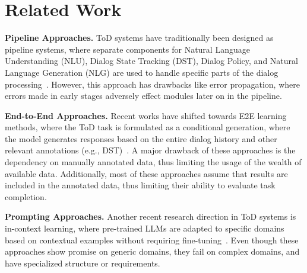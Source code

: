 \vspace{-8pt}
\section{Related Work}
\vspace{-7pt}

\textbf{Pipeline Approaches.}
ToD systems have traditionally been designed as pipeline systems, where separate components for Natural Language Understanding (NLU), Dialog State Tracking (DST), Dialog Policy, and Natural Language Generation (NLG) are used to handle specific parts of the dialog processing~\cite{ren2018towards, lee2013structured,peng2018deep,le2021predictable,wen2015semantically,peng2020few,chen2019semantically,budzianowski2018towards,Mosharrof2023TowardOS}. However, this approach has drawbacks like error propagation, where errors made in early stages adversely effect modules later on in the pipeline. 

\noindent
\textbf{End-to-End Approaches.}
Recent works have shifted towards E2E learning methods, where the ToD task is formulated as a conditional generation, where the model generates responses based on the entire dialog history and other relevant annotations (e.g., DST)~\cite{hosseini2020simple,Lin2021LeveragingSD,Bang2023TaskOptimizedAF,Zhang2023EnhancingPO,Ham2020EndtoEndNP,Chung2023InstructTODSLL,Yang2020UBARTF,Sun2022BORTBA,Imrattanatrai2023EndtoEndTD,Sun2022MarsSC,Zhao2022AnyTODAP,Peng2021SoloistBT,Mosharrof2023ZeroShotGE,Siddique2022PersonalizingTD}. 
A major drawback of these approaches is the dependency on manually annotated data, thus limiting the usage of the wealth of available data. Additionally, most of these approaches assume that {\apicall} results are included in the annotated data, thus limiting their ability to evaluate task completion.

\noindent
\textbf{Prompting Approaches.}
Another recent research direction in ToD systems is in-context learning, where pre-trained LLMs are adapted to specific domains based on contextual examples without requiring fine-tuning~\cite{Labruna2023UnravelingCA,Hudevcek2023AreLL,Dingliwal2021FewSD, Madotto2020LanguageMA, Li2022ControllableDS, Madotto2021FewShotBP,Xu2024RethinkingTD}.
Even though these approaches show promise on generic domains, they fail on complex domains, and have specialized structure or requirements. 


